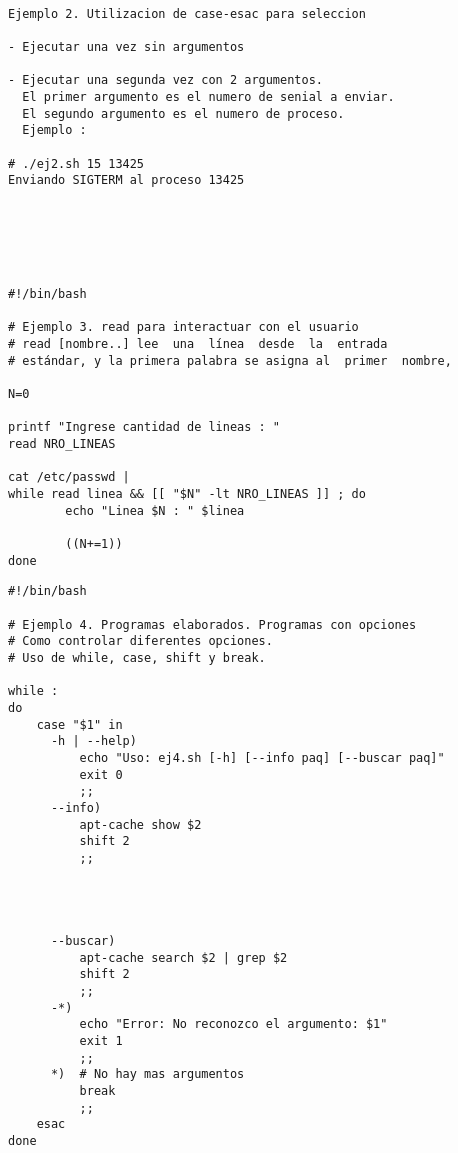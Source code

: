 \documentclass{beamer}
\begin{document}
\begin{Verbatim}

Ejemplo 2. Utilizacion de case-esac para seleccion

- Ejecutar una vez sin argumentos

- Ejecutar una segunda vez con 2 argumentos.
  El primer argumento es el numero de senial a enviar.
  El segundo argumento es el numero de proceso.
  Ejemplo : 

# ./ej2.sh 15 13425
Enviando SIGTERM al proceso 13425






\end{Verbatim}

\begin{Verbatim}
#!/bin/bash

# Ejemplo 3. read para interactuar con el usuario
# read [nombre..] lee  una  línea  desde  la  entrada
# estándar, y la primera palabra se asigna al  primer  nombre,

N=0

printf "Ingrese cantidad de lineas : "
read NRO_LINEAS

cat /etc/passwd | 
while read linea && [[ "$N" -lt NRO_LINEAS ]] ; do
        echo "Linea $N : " $linea

        ((N+=1))
done

\end{Verbatim}


\begin{Verbatim}
#!/bin/bash

# Ejemplo 4. Programas elaborados. Programas con opciones
# Como controlar diferentes opciones.
# Uso de while, case, shift y break.

while :
do
    case "$1" in
      -h | --help)
          echo "Uso: ej4.sh [-h] [--info paq] [--buscar paq]"
          exit 0
          ;;
      --info)
          apt-cache show $2
          shift 2
          ;;




      --buscar)
          apt-cache search $2 | grep $2
          shift 2
          ;;
      -*)
          echo "Error: No reconozco el argumento: $1"
          exit 1
          ;;
      *)  # No hay mas argumentos
          break
          ;;
    esac
done



\end{Verbatim}
\end{document}
